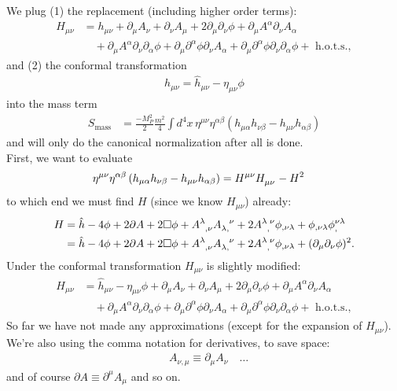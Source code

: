\documentclass{book}
\theoremstyle{definition}
\newcommand{\p}{\partial}
\newcommand{\nn}{\nonumber}
\newcommand{\al}{\alpha}
\newcommand{\be}{\beta}
\newcommand{\f}[2]{\frac{#1}{#2}}
\newcommand{\lp}{\left(}
\newcommand{\rp}{\right)}
\begin{document}
\begin{framed}
	
	We plug (1) the replacement (including higher order terms):
	\begin{align}
	H_{\mu\nu} &= {h_{\mu\nu}} + {\p_\mu A_\nu} + {\p_\nu A_\mu} + {2\p_\mu \p_\nu \phi} + {\p_\mu A^\al \p_\nu A_\al} \nn\\
	&\quad + {\p_\mu A^\al \p_\nu \p_\al \phi} + {\p_\mu\p^\al \phi \p_\nu A_\al} + \p_\mu \p^\al \phi \p_\nu \p_\al \phi + \text{ h.o.t.s.},
	\end{align}
	and (2) the conformal transformation
	\begin{align}
	h_{\mu\nu} = \hat{h}_{\mu\nu} - \eta_{\mu\nu} \phi
	\end{align} 
	into the mass term
	\begin{align}
	S_\text{mass} &= \f{-M_P^2}{2}\f{m^2}{4}\int d^4x\, \eta^{\mu\nu}\eta^{\al\be}\lp h_{\mu\al}h_{\nu\be} - h_{\mu\nu}h_{\al\be} \rp
	\end{align}
	and will only do the canonical normalization after all is done. \\
	
	First, we want to evaluate
	\begin{align}
	\eta^{\mu\nu}\eta^{\al\be}\lp h_{\mu\al}h_{\nu\be} - h_{\mu\nu}h_{\al\be} \rp&=\tensor{H}{^{\mu\nu}}\tensor{H}{_{\mu\nu}} - H^2
	\end{align}
	to which end we must find $H$ (since we know $H_{\mu\nu}$) already:
	\begin{align}
	H &= \hat{h} - 4\phi + 2\p A + 2\square \phi + \tensor{A}{^\lambda_{,\nu}}\tensor{A}{_{\lambda,}^\nu} + 2 \tensor{A}{^\lambda_,^\nu}\phi_{,\nu\lambda} + \phi_{,\nu\lambda}\phi_,^{\nu\lambda} \nn\\
	&= \hat{h} - 4\phi + 2\p A + 2\square \phi + \tensor{A}{^\lambda_{,\nu}}\tensor{A}{_{\lambda,}^\nu} + 2 \tensor{A}{^\lambda_,^\nu}\phi_{,\nu\lambda} + (\p_\mu\p_\nu \phi)^2.
	\end{align}
	Under the conformal transformation $H_{\mu\nu}$ is slightly modified:
	\begin{align}
	H_{\mu\nu} &= {\hat{h}_{\mu\nu}} - \eta_{\mu\nu}\phi + {\p_\mu A_\nu} + {\p_\nu A_\mu} + {2\p_\mu \p_\nu \phi} + {\p_\mu A^\al \p_\nu A_\al} \nn\\
	&\quad + {\p_\mu A^\al \p_\nu \p_\al \phi} + {\p_\mu\p^\al \phi \p_\nu A_\al} + \p_\mu \p^\al \phi \p_\nu \p_\al \phi + \text{ h.o.t.s.},
	\end{align}
	So far we have not made any approximations (except for the expansion of $H_{\mu\nu}$). We're also using the comma notation for derivatives, to save space:
	\begin{align}
	&A_{\nu,\mu} \equiv \p_\mu A_\nu \quad \dots
	\end{align}
	and of course $\p A \equiv \p^\mu A_\mu$ and so on.
	

\end{framed}
\end{document}
